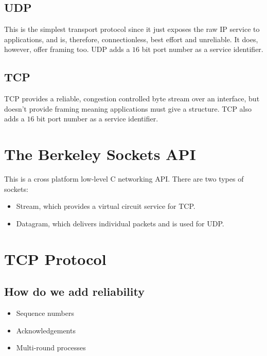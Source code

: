 \subsection{UDP}\label{sub:udp}

This is the simplest transport protocol since it just exposes the raw IP service to applications, and is, therefore, connectionless, best effort and unreliable.
It does, however, offer framing too.
UDP adds a \(16\) bit port number as a service identifier.

\subsection{TCP}\label{sub:tcp}

TCP provides a reliable, congestion controlled byte stream over an interface, but doesn't provide framing meaning applications must give a structure.
TCP also adds a \(16\) bit port number as a service identifier.

\section{The Berkeley Sockets API}\label{sec:the_berkeley_sockets_api}

This is a cross platform low-level C networking API.
There are two types of sockets:
\begin{itemize}
	\item Stream, which provides a virtual circuit service for TCP.
	\item Datagram, which delivers individual packets and is used for UDP.
\end{itemize}

\section{TCP Protocol}\label{sec:tcp}

\subsection{How do we add reliability}\label{sub:how_do_we_add_reliability}

\begin{itemize}
	\item Sequence numbers
	\item Acknowledgements
	\item Multi-round processes
\end{itemize}


